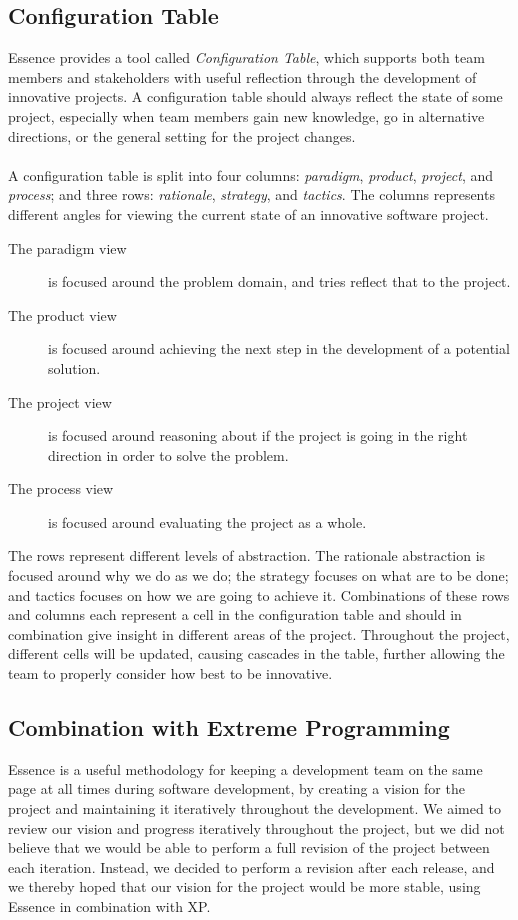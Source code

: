 \subsection{Configuration Table}
Essence provides a tool called \emph{Configuration Table}\parencite{essence_book}, which supports both team members and stakeholders with useful reflection through the development of innovative projects. A configuration table should always reflect the state of some project, especially when team members gain new knowledge, go in alternative directions, or the general setting for the project changes.
\\\\
A configuration table is split into four columns: \emph{paradigm}, \emph{product}, \emph{project}, and \emph{process}; and three rows: \emph{rationale}, \emph{strategy}, and \emph{tactics}. The columns represents different angles for viewing the current state of an innovative software project. 
\begin{description}
	\item[The paradigm view] is focused around the problem domain, and tries reflect that to the project. 
	\item[The product view] is focused around achieving the next step in the development of a potential solution. 
	\item[The project view] is focused around reasoning about if the project is going in the right direction in order to solve the problem. 
	\item[The process view] is focused around evaluating the project as a whole. 
\end{description}

The rows represent different levels of abstraction. The rationale abstraction is focused around why we do as we do; the strategy focuses on what are to be done; and tactics focuses on how we are going to achieve it. Combinations of these rows and columns each represent a cell in the configuration table and should in combination give insight in different areas of the project. Throughout the project, different cells will be updated, causing cascades in the table, further allowing the team to properly consider how best to be innovative. 


\subsection{Combination with Extreme Programming}
\label{sub:combination_with_extreme_programming}
Essence is a useful methodology for keeping a development team on the same page at all times during software development, by creating a vision for the project and maintaining it iteratively throughout the development. We aimed to review our vision and progress iteratively throughout the project, but we did not believe that we would be able to perform a full revision of the project between each iteration. Instead, we decided to perform a revision after each release, and we thereby hoped that our vision for the project would be more stable, using Essence in combination with XP. 